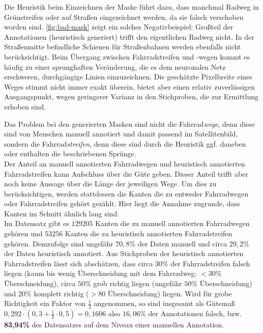 Die Heuristik beim Einzeichnen der Maske führt dazu, dass manchmal Radweg in Grünstreifen oder auf Straßen eingezeichnet werden, da sie falsch verschoben worden sind.
\autoref{fig:bad-mask} zeigt ein solches Negativbeispiel: Großteil der Annotationen (heuristisch generiert) trifft den eigentlichen Radweg nicht. 
In der Straßenmitte befindliche Schienen für Straßenbahnen werden ebenfalls nicht berücksichtigt.
Beim Übergang zwischen Fahrradstreifen und -wegen kommt es häufig zu einer sprunghaften Veränderung, die es dem neuronalen Netz erschweren, durchgängige Linien einzuzeichnen.
Die geschätzte Pixelbreite eines Weges stimmt nicht immer exakt überein, bietet aber einen relativ zuverlässigen Ausgangspunkt, wegen geringerer Varianz in den Stichproben, 
die zur Ermittlung erhoben sind.

Das Problem bei den generierten Masken sind nicht die Fahrrad\textit{wege}, denn diese sind von Menschen manuell annotiert und damit passend im Satellitenbild, 
sondern die Fahrrad\textit{streifen}, denn diese sind durch die Heuristik ggf. daneben oder enthalten die beschriebenen Sprünge. \\
Der Anteil an manuell annotierten Fahrradwegen und heuristisch annotierten Fahrradstreifen kann Aufschluss über die Güte geben. 
Dieser Anteil trifft aber noch keine Aussage über die Länge der jeweiligen Wege. Um dies zu berücksichtigen, werden stattdessen die Kanten die zu 
entweder Fahrradwegen oder Fahrradstreifen gehört gezählt. Hier liegt die Annahme zugrunde, dass Kanten im Schnitt ähnlich lang sind.\\
Im Datensatz gibt es $129205$ Kanten die zu manuell annotierten Fahrradwegen gehören und $53256$ Kanten die zu heuristisch annotierten Fahrradstreifen gehören. 
Demzufolge sind ungefähr $70,8\%$ der Daten manuell und circa $29,2\%$ der Daten heuristisch annotiert. 
Aus Stichproben der heuristisch annotierten Fahrradstreifen lässt sich abschätzen, dass circa $30\%$ der Fahrradstreifen falsch liegen 
(kaum bis wenig Überschneidung mit dem Fahrradweg; $<30\%$ Überschneidung), circa $50\%$ grob richtig liegen (ungefähr $50\%$ Überschneidung)
und $20\%$ komplett richtig ($>80$ Überschneidung) liegen. Wird für grobe Richtigkeit ein Faktor von $\frac{1}{2}$ angenommen, so sind insgesamt
als Gütemaß $0,292 \cdot (0,3 + \frac{1}{2} \cdot 0,5) = 0,1606$ also $16,06\%$ der Annotationen falsch, bzw. 
\textbf{83,94\%} des Datensatzes auf dem Niveau einer manuellen Annotation. 
   

